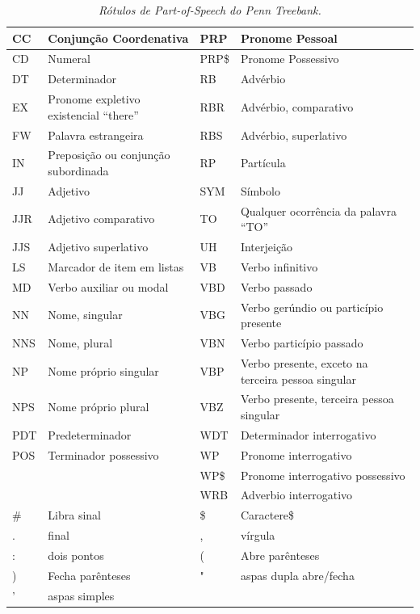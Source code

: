 \begin{table}
   \centering
   \small
   \caption{\it Rótulos de \emph{Part-of-Speech} do \emph{Penn Treebank}.}

   \begin{tabular}{| p{2cm} | p{4cm} | p{2cm} | p{4cm} |}

   \hline

		CC & Conjunção Coordenativa 	& 	PRP & Pronome Pessoal\\
    \hline
		CD & Numeral &   	PRP\$ & Pronome Possessivo\\
      \hline
		DT & Determinador     &		RB & Advérbio\\
      \hline
		EX & Pronome expletivo existencial ``there''     &		RBR & Advérbio, comparativo\\
      \hline
		FW & Palavra estrangeira     &		RBS & Advérbio, superlativo\\
      \hline
		IN & Preposição ou conjunção subordinada      &		RP & Partícula\\
      \hline
		JJ & Adjetivo      &		SYM & Símbolo\\
      \hline
		JJR & Adjetivo comparativo      &		TO & Qualquer ocorrência da palavra ``TO''\\
      \hline
		JJS & Adjetivo superlativo      &		UH & Interjeição\\
      \hline
		LS & Marcador de item em listas      &		VB & Verbo infinitivo\\
      \hline
		MD & Verbo auxiliar ou modal      &		VBD & Verbo passado\\
      \hline
		NN & Nome, singular      &		VBG & Verbo gerúndio ou particípio presente\\
      \hline
		NNS & Nome, plural      &		VBN & Verbo particípio passado\\
      \hline
		NP & Nome próprio singular      &		VBP & Verbo presente, exceto na terceira pessoa singular\\
      \hline
		NPS & Nome próprio plural      &		VBZ & Verbo presente, terceira pessoa singular\\
      \hline
		PDT & Predeterminador      &		WDT & Determinador interrogativo\\
      \hline
		POS & Terminador possessivo      &		WP & Pronome interrogativo\\
    \hline
     & & 	WP\$ & Pronome interrogativo possessivo\\
    \hline
     & & 	WRB & Adverbio interrogativo  \\
    \hline
     \# & Libra sinal & \$ & Caractere\$ \\
    \hline
     . & final & , & vírgula \\
    \hline
     : & dois pontos & ( & Abre parênteses \\
    \hline
     ) & Fecha parênteses & " & aspas dupla abre/fecha \\
     \hline
     ' & aspas simples & &  \\
    \hline

   \end{tabular}
   \label{tbl:penn_treebank_pos}
\end{table}



